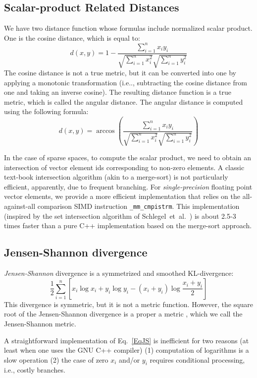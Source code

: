 \documentclass[runningheads,a4paper]{llncs}
\begin{document}
{\subsection{Scalar-product Related Distances}
We have two distance function whose formulas include normalized scalar product.
One is the cosine distance, which is equal to:
$$
d(x,y) =1-\frac{\sum_{i=1}^n x_i y_i} 
{\sqrt{\sum_{i=1}^n x_i^2} \sqrt{\sum_{i=1}^n y_i^2 } } 
$$ 
The cosine distance is not a true metric, but it can be converted into
one by applying a monotonic transformation (i.e.., subtracting the 
cosine distance from one and taking an inverse cosine).
The resulting distance function is a true metric, which is called the angular distance.
The angular distance is computed using the following formula:
$$
d(x,y) =\arccos\left(\frac{\sum_{i=1}^n x_i y_i} 
{\sqrt{\sum_{i=1}^n x_i^2} \sqrt{\sum_{i=1}^n y_i^2 } }\right) 
$$ 

In the case of sparse spaces, to compute the scalar product,
we need to obtain an intersection of vector element ids
corresponding to non-zero elements.
A classic text-book intersection algorithm (akin to a merge-sort)
is not particularly efficient, apparently,
due to frequent branching.
For \emph{single-precision} floating point vector elements,
we provide a more efficient implementation that relies on the 
all-against-all comparison SIMD instruction \texttt{\_mm\_cmpistrm}.
This implementation  (inspired by the set intersection algorithm of Schlegel~et~al.~\cite{schlegel2011fast})
is about 2.5-3 times faster than a pure C++ implementation based on the merge-sort approach.

\subsection{Jensen-Shannon divergence}\label{SectionJS}
\emph{Jensen-Shannon} divergence is a symmetrized and smoothed KL-divergence:
\begin{equation}\label{EqJS}
\frac{1}{2}\sum_{i=1}^n\left[ x_i \log x_i + y_i \log y_i  -(x_i+y_i)\log \frac{x_i +y_i}{2}\right]
\end{equation}
This divergence is symmetric, but it is not a metric function.
However, the square root of the Jensen-Shannon divergence
is a proper a metric \cite{endres2003new},
which we call the Jensen-Shannon metric.

A straightforward implementation of Eq.~\ref{EqJS} is inefficient for two reasons 
(at least when one uses the GNU C++ compiler)
(1) computation of logarithms is a slow operation (2)
the case of zero $x_i$ and/or $y_i$ requires conditional processing, i.e.,
costly branches.

}
\end{document}
